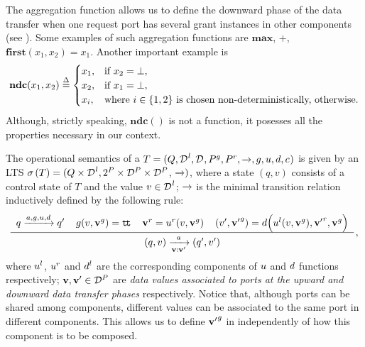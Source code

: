 The aggregation function allows us to define the downward phase of the data
transfer when one request port has several grant instances in other
components (see ).  Some examples of such
aggregation functions are $\mathbf{max}$, $+$, $\mathbf{first}(x_1, x_2) = x_1$.
Another important example is 
%
\[
\mathbf{ndc}(x_1, x_2) \bydef{=} 
\begin{cases}
  x_1, & \mbox{if } x_2 = \bot,\\
  x_2, & \mbox{if } x_1 = \bot,\\
  x_i, & \mbox{where $i \in \{1,2\}$ is chosen non-deterministically, 
    otherwise.}
\end{cases}
\] 
%
Although, strictly speaking, $\mathbf{ndc}()$ is not a function, it
posesses all the properties necessary in our context.

\begin{definition}
  \label{defn:data:semantics}
  The operational semantics of a \datamodel{} $T = (Q, \local{\data},
  \data, \pin, \pout, \goesto{}, \guard, \up, \down, \combine)$ is given by
  an LTS $\undata{T} = (Q \times \local{\data}, 2^P \times \data[P] \times
  \data[P]$, \mbox{$\goesto{})$}, where a state $(q, v)$ consists of a
  control state of $T$ and the value $v \in \local{\data}$; $\goesto{}$ is
  the minimal transition relation inductively defined by the following
  rule:
  \begin{equation}
    \label{eq:data:semantics}
    \renewcommand{\arraystretch}{1.5}
    \derrule[4]{
      q \goesto{a,\guard,\up,\down} q'
      &
      \guard(v, \grant{\portdata{v}}) = \true
      &
      \request{\portdata{v}} = 
      \request{\up}(v, \grant{\portdata{v}})
      &
      (v', \grant{\portdata{v'}}) =
      \down\Big(
      \local{\up}(v, \grant{\portdata{v}}),
      \request{\portdata{v'}}, 
      \grant{\portdata{v}}
      \Big)
    }{
      (q, v)
      \goesto[\portdata{v}:\portdata{v'}]{a}
      (q', v')
    }\,,
  \end{equation}
  where $\local{\up}$, $\request{\up}$ and $\local{\down}$ are the
  corresponding components of $\up$ and $\down$ functions respectively;
  $\portdata{v}, \portdata{v'} \in \data[P]$ are \emph{data values
    associated to ports at the upward and downward data transfer phases}
  respectively.  Notice that, although ports can be shared among
  components, different values can be associated to the same port in
  different components.  This allows us to define $\grant{\portdata{v'}}$
  in  independently of how this component is to be
  composed.
\end{definition}

